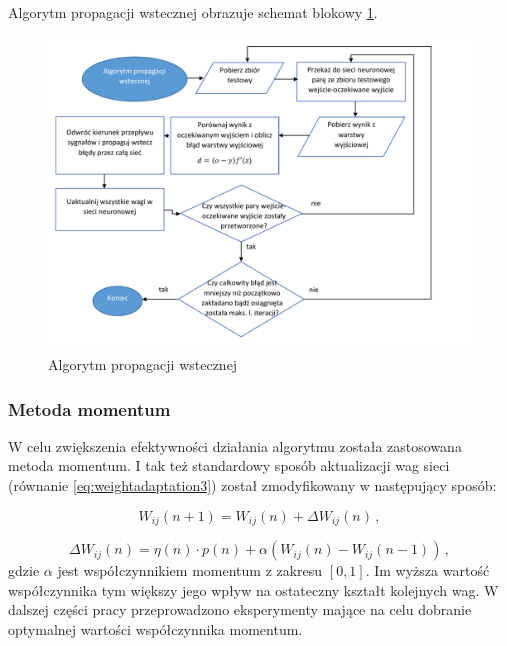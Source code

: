 \documentclass[twoside]{iisthesis}
\begin{document}
	 Algorytm propagacji wstecznej obrazuje schemat blokowy \ref{fig:propagacjawsteczna}.
	 
	 \begin{figure}[!ht] 
			 	\centering
			 	\includegraphics[width=1\textwidth]{propagacjawsteczna}
			 	\caption{Algorytm propagacji wstecznej}
			 	\label{fig:propagacjawsteczna}
	 \end{figure}
	 
	 \subsubsection{Metoda momentum}
	 \label{sss:metoda_momentum}
	 
	 W celu zwiększenia efektywności działania algorytmu została zastosowana metoda momentum. I tak też standardowy sposób aktualizacji wag sieci (równanie \ref{eq:weightadaptation3}) został zmodyfikowany w następujący sposób:
	 
	 \begin{equation}
	 \label{eq:zasadamomentum1}
	 W_{ij}(n+1) = W_{ij}(n) + \Delta W_{ij}(n) 
	 \,,
	 \end{equation}
	 
	 \begin{equation}
	 \label{eq:zasadamomentum2}
	 \Delta W_{ij}(n) = \eta(n) \cdot p(n) + \alpha(W_{ij}(n)-W_{ij}(n-1)) 
	 \,,
	 \end{equation}		 
	 gdzie $\alpha$ jest współczynnikiem momentum z zakresu $[0,1]$. Im wyższa wartość współczynnika tym większy jego wpływ na ostateczny kształt kolejnych wag. W dalszej części pracy przeprowadzono eksperymenty mające na celu dobranie optymalnej wartości współczynnika momentum.
	 
\end{document}
